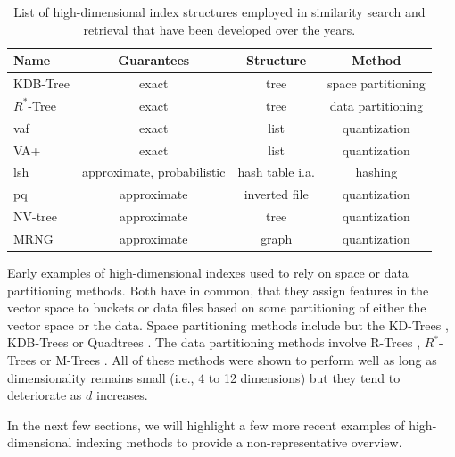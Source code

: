 \begin{table}
    \begin{tabular}{ | l | c | c | c |}
        \hline
        \textbf{Name} & \textbf{Guarantees} & \textbf{Structure} & \textbf{Method} \\
        \hline
        \hline
        KDB-Tree \cite{Robinson:1981KDB} & exact & tree & space partitioning \\  
        \hline
        $R^{*}$-Tree \cite{Beckmann:1990RTree} & exact & tree & data partitioning \\ 
        \hline
        \acrshort{vaf} \cite{Weber:1998Va} & exact & list & quantization \\ 
        \hline
        VA+ \cite{Ferhatosmanoglu:2000Vector} & exact & list & quantization \\ 
        \hline
        \acrshort{lsh} \cite{Indyk1998:Approximate, Wang:2017ASurvey} & approximate, probabilistic & hash table i.a.  & hashing \\ 
        \hline
        \acrshort{pq} \cite{Jegou:2010Product} & approximate & inverted file & quantization \\ 
        \hline
        NV-tree \cite{Lejsek:2009NVTree} & approximate & tree & quantization \\ 
        \hline
        MRNG \cite{Lejsek:2009NVTree} & approximate & graph & quantization \\ 
        \hline
    \end{tabular}
    \caption{List of high-dimensional index structures employed in similarity search and retrieval that have been developed over the years.}
    \label{table:index_structures}
\end{table}

Early examples of high-dimensional indexes used to rely on space or data partitioning methods. Both have in common, that they assign features in the vector space to buckets or data files based on some partitioning of either the vector space or the data. Space partitioning methods include but the KD-Trees \cite{Bentley:1975Multidimensional}, KDB-Trees \cite{Robinson:1981KDB} or Quadtrees \cite{Finkel:1974Quad}. The data partitioning methods involve R-Trees \cite{Guttmann:1984RTrees}, $R^{*}$-Trees \cite{Beckmann:1990RTree} or M-Trees \cite{Ciaccia:1997Mtree}. All of these methods were shown to perform well as long as dimensionality remains small (i.e., 4 to 12 dimensions) but they tend to deteriorate as $d$ increases.

In the next few sections, we will highlight a few more recent examples of high-dimensional indexing methods to provide a non-representative overview.

